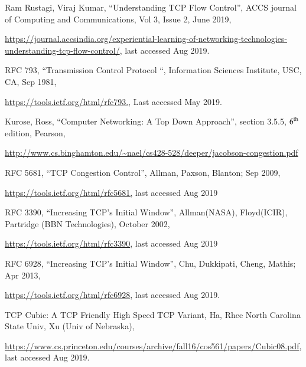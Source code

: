 \begin{multicols}{2}
\begin{enumerate}[i.]
\begin{itemize}
   \end{itemize}

\end{enumerate}

\vskip -1.3cm

\hfill{}

\begin{thebibliography}{99}
 Ram Rustagi, Viraj Kumar, “Understanding TCP Flow Control”, ACCS journal of Computing and Communications, Vol 3, Issue 2, June 2019,

 \url{https://journal.accsindia.org/experiential-learning-of-networking-technologies-understanding-tcp-flow-control/}, last accessed Aug 2019.

  RFC 793, “Transmission Control Protocol “, Information Sciences Institute, USC, CA, Sep 1981,

\url{https://tools.ietf.org/html/rfc793.}, Last accessed May 2019.

 Kurose, Ross, “Computer Networking: A Top Down Approach”, section 3.5.5, ${\rm 6}^{\text{th}}$ edition, Pearson, 

 \url{http://www.cs.binghamton.edu/~nael/cs428-528/deeper/jacobson-congestion.pdf}

 RFC 5681, “TCP Congestion Control”, Allman, Paxson, Blanton; Sep 2009,

\url{https://tools.ietf.org/html/rfc5681,}  last accessed Aug 2019

RFC 3390, “Increasing TCP’s Initial Window”, Allman(NASA), Floyd(ICIR), Partridge (BBN Technologies), October 2002,

 \url{https://tools.ietf.org/html/rfc3390}, last accessed Aug 2019

  RFC 6928, “Increasing TCP’s Initial Window”, Chu, Dukkipati, Cheng, Mathis; Apr 2013, 

 \url{https://tools.ietf.org/html/rfc6928}, last accessed Aug 2019.

 TCP Cubic: A TCP Friendly High Speed TCP Variant, {Ha, Rhee} North Carolina State Univ, Xu (Univ of Nebraska),

\url{https://www.cs.princeton.edu/courses/archive/fall16/cos561/papers/Cubic08.pdf}, last accessed Aug 2019.


\end{thebibliography}
\end{multicols}
